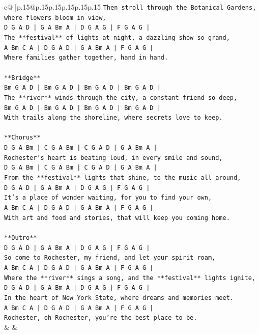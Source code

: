 \documentclass{article}
\begin{document}
{\begin{supertabular}{c@{$\;$}|p{.15\linewidth}@{}p{.15\linewidth}p{.15\linewidth}p{.15\linewidth}p{.15\linewidth}p{.15\linewidth}}
{{{\texttt{Then stroll through the Botanical Gardens, where flowers bloom in view,  } \\
\texttt{D G A D | G A Bm A | D G A G | F G A G |} \\
\texttt{The **festival** of lights at night, a dazzling show so grand,  } \\
\texttt{A Bm C A | D G A D | G A Bm A | F G A G |} \\
\texttt{Where families gather together, hand in hand.} \\
\\ 
\texttt{**Bridge**} \\
\texttt{Bm G A D | Bm G A D | Bm G A D | Bm G A D |} \\
\texttt{The **river** winds through the city, a constant friend so deep,  } \\
\texttt{Bm G A D | Bm G A D | Bm G A D | Bm G A D |} \\
\texttt{With trails along the shoreline, where secrets love to keep.} \\
\\ 
\texttt{**Chorus**} \\
\texttt{D G A Bm | C G A Bm | C G A D | G A Bm A |} \\
\texttt{Rochester’s heart is beating loud, in every smile and sound,  } \\
\texttt{D G A Bm | C G A Bm | C G A D | G A Bm A |} \\
\texttt{From the **festival** lights that shine, to the music all around,  } \\
\texttt{D G A D | G A Bm A | D G A G | F G A G |} \\
\texttt{It’s a place of wonder waiting, for you to find your own,  } \\
\texttt{A Bm C A | D G A D | G A Bm A | F G A G |} \\
\texttt{With art and food and stories, that will keep you coming home.} \\
\\ 
\texttt{**Outro**} \\
\texttt{D G A D | G A Bm A | D G A G | F G A G |} \\
\texttt{So come to Rochester, my friend, and let your spirit roam,  } \\
\texttt{A Bm C A | D G A D | G A Bm A | F G A G |} \\
\texttt{Where the **river** sings a song, and the **festival** lights ignite,  } \\
\texttt{D G A D | G A Bm A | D G A G | F G A G |} \\
\texttt{In the heart of New York State, where dreams and memories meet.  } \\
\texttt{A Bm C A | D G A D | G A Bm A | F G A G |} \\
\texttt{Rochester, oh Rochester, you’re the best place to be.} \\
            }
        }
    }
    & & \\ \\


\end{supertabular}}
\end{document}

